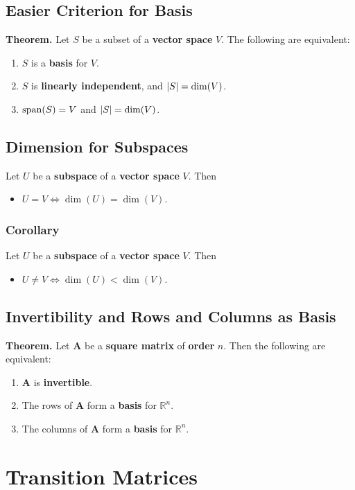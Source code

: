 \documentclass[../ma2001_notes.tex]{subfiles}
\begin{document}
\subsection{Easier Criterion for Basis}
\textbf{Theorem.} Let \(S\) be a subset of a \textbf{vector space} \(V\). The following are equivalent:
\begin{enumerate}
	\item\(S\) is a \textbf{basis} for \(V\).
	\item\(S\) is \textbf{linearly independent}, and \(\lvert S\rvert=\dim(V)\).
	\item\(\operatorname{span}(S)=V\) and \(\lvert S\rvert=\dim(V)\).
\end{enumerate}

\subsection{Dimension for Subspaces}
Let \(U\) be a \textbf{subspace} of a \textbf{vector space} \(V\). Then
\begin{itemize}
	\item\(U=V\Leftrightarrow\dim(U)=\dim(V)\).
\end{itemize}

\subsubsection{Corollary}
Let \(U\) be a \textbf{subspace} of a \textbf{vector space} \(V\). Then
\begin{itemize}
	\item\(U\ne V\Leftrightarrow\dim(U)<\dim(V)\).
\end{itemize}

\subsection{Invertibility and Rows and Columns as Basis}
\textbf{Theorem.} Let \(\bm{A}\) be a \textbf{square matrix} of \textbf{order} \(n\). Then the following are equivalent:
\begin{enumerate}
	\item\(\bm{A}\) is \textbf{invertible}.
	\item The rows of \(\bm{A}\) form a \textbf{basis} for \(\mathbb{R}^n\).
	\item The columns of \(\bm{A}\) form a \textbf{basis} for \(\mathbb{R}^n\).
\end{enumerate}

\section{Transition Matrices}
\end{document}
